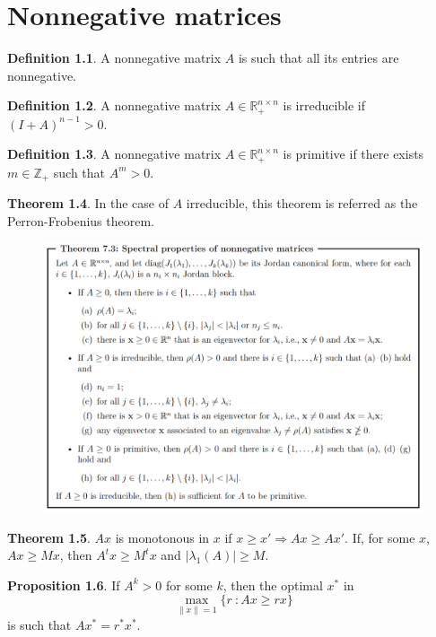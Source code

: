 \documentclass[12pt, openany]{report}
\theoremstyle{definition}
\newtheorem{thm}{Theorem}[chapter]
\newtheorem{definition}[thm]{Definition}
\newtheorem{proposition}[thm]{Proposition}
\newcommand{\R}{\mathbb{R}}
\begin{document}
\chapter{Nonnegative matrices}
\begin{definition}
    A nonnegative matrix $A$ is such that all its entries are nonnegative.
\end{definition}
\begin{definition}
    A nonnegative matrix $A\in \R_+^{n\times n}$ is irreducible if $(I+A)^{n-1} >0$.
\end{definition}
\begin{definition}
    A nonnegative matrix $A\in \R_+^{n\times n}$ is primitive if there exists $m\in \mathbb{Z}_+$ such that $A^m>0$.
\end{definition}
\begin{thm}
    In the case of $A$ irreducible, this theorem is referred as the Perron-Frobenius theorem.
    \begin{figure}[H]
        \centering
        \includegraphics[width=\textwidth]{img/nonnegative_matrices.png}
    \end{figure}
\end{thm}
\begin{thm}
    $Ax$ is monotonous in $x$ if $x\ge x'\Longrightarrow Ax\ge Ax'$. If, for some $x$, $Ax\ge Mx$, then $A^tx\ge M^tx$ and $|\lambda_1(A)|\ge M$.
\end{thm}
\begin{proposition}
    If $A^k>0$ for some $k$, then the optimal $x^*$ in 
    \begin{equation}
        \max_{\lVert x\rVert = 1} \{r\: :Ax\ge rx\}
    \end{equation}
    is such that $Ax^* = r^*x^*$. 
\end{proposition}
\end{document}
